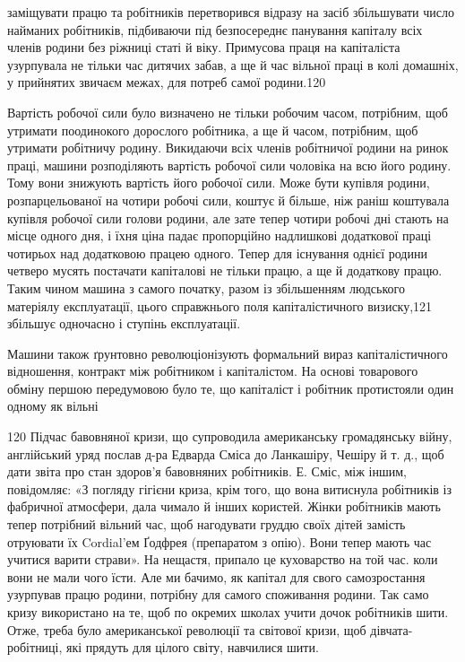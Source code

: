заміщувати працю та робітників перетворився відразу на засіб
збільшувати число найманих робітників, підбиваючи під безпосереднє
панування капіталу всіх членів родини без ріжниці статі
й віку. Примусова праця на капіталіста узурпувала не тільки час
дитячих забав, а ще й час вільної праці в колі домашніх, у прийнятих
звичаєм межах, для потреб самої родини.120

Вартість робочої сили було визначено не тільки робочим
часом, потрібним, щоб утримати поодинокого дорослого робітника,
а ще й часом, потрібним, щоб утримати робітничу родину.
Викидаючи всіх членів робітничої родини на ринок праці, машини
розподіляють вартість робочої сили чоловіка на всю його родину.
Тому вони знижують вартість його робочої сили. Може бути купівля
родини, розпарцельованої на чотири робочі сили, коштує й
більше, ніж раніш коштувала купівля робочої сили голови родини,
але зате тепер чотири робочі дні стають на місце одного дня, і їхня
ціна падає пропорційно надлишкові додаткової праці чотирьох
над додатковою працею одного. Тепер для існування однієї родини
четверо мусять постачати капіталові не тільки працю, а ще й
додаткову працю. Таким чином машина з самого початку, разом
із збільшенням людського матеріялу експлуатації, цього справжнього
поля капіталістичного визиску,121 збільшує одночасно і
ступінь експлуатації.

Машини також ґрунтовно революціонізують формальний вираз
капіталістичного відношення, контракт між робітником і капіталістом.
На основі товарового обміну першою передумовою було
те, що капіталіст і робітник протистояли один одному як вільні

120  Підчас бавовняної кризи, що супроводила американську громадянську
війну, англійський уряд послав д-ра Едварда Сміса до Ланкашіру,
Чешіру й т. д., щоб дати звіта про стан здоров’я бавовняних робітників.
Е. Сміс, між іншим, повідомляє: «З погляду гігієни криза, крім
того, що вона витиснула робітників із фабричної атмосфери, дала чимало
й інших користей. Жінки робітників мають тепер потрібний вільний
час, щоб нагодувати груддю своїх дітей замість отруювати їх Cordial’ем
Ґодфрея (препаратом з опію). Вони тепер мають час учитися варити страви».
На нещастя, припало це куховарство на той час. коли вони не мали
чого їсти. Але ми бачимо, як капітал для свого самозростання узурпував
працю родини, потрібну для самого споживання родини. Так само кризу
використано на те, щоб по окремих школах учити дочок робітників шити.
Отже, треба було американської революції та світової кризи, щоб дівчата-робітниці,
які прядуть для цілого світу, навчилися шити.

